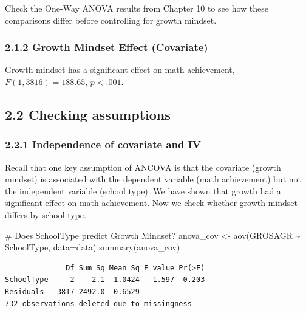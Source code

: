 \documentclass[
  letterpaper,
  DIV=11,
  numbers=noendperiod]{scrreprt}
\newenvironment{Shaded}{\begin{snugshade}}{\end{snugshade}}
\newcommand{\AttributeTok}[1]{\textcolor[rgb]{0.40,0.45,0.13}{#1}}
\newcommand{\CommentTok}[1]{\textcolor[rgb]{0.37,0.37,0.37}{#1}}
\newcommand{\FunctionTok}[1]{\textcolor[rgb]{0.28,0.35,0.67}{#1}}
\newcommand{\NormalTok}[1]{\textcolor[rgb]{0.00,0.23,0.31}{#1}}
\newcommand{\OtherTok}[1]{\textcolor[rgb]{0.00,0.23,0.31}{#1}}
\newcommand{\SpecialCharTok}[1]{\textcolor[rgb]{0.37,0.37,0.37}{#1}}
\begin{document}
Check the One-Way ANOVA results from Chapter 10 to see how these
comparisons differ before controlling for growth mindset.

\subsubsection*{2.1.2 Growth Mindset Effect
(Covariate)}\label{growth-mindset-effect-covariate}

Growth mindset has a significant effect on math achievement,
\(F(1,3816) = 188.65, \, p < .001\).

\subsection*{2.2 Checking assumptions}\label{checking-assumptions}

\subsubsection*{2.2.1 Independence of covariate and
IV}\label{independence-of-covariate-and-iv}

Recall that one key assumption of ANCOVA is that the covariate (growth
mindset) is associated with the dependent variable (math achievement)
but not the independent variable (school type). We have shown that
growth had a significant effect on math achievement. Now we check
whether growth mindset differs by school type.

\begin{Shaded}
\begin{Highlighting}[]
\CommentTok{\# Does SchoolType predict Growth Mindset? }
\NormalTok{anova\_cov }\OtherTok{\textless{}{-}} \FunctionTok{aov}\NormalTok{(GROSAGR }\SpecialCharTok{\textasciitilde{}}\NormalTok{ SchoolType, }\AttributeTok{data=}\NormalTok{data) }
\FunctionTok{summary}\NormalTok{(anova\_cov) }
\end{Highlighting}
\end{Shaded}

\begin{verbatim}
              Df Sum Sq Mean Sq F value Pr(>F)
SchoolType     2    2.1  1.0424   1.597  0.203
Residuals   3817 2492.0  0.6529               
732 observations deleted due to missingness
\end{verbatim}
\end{document}
